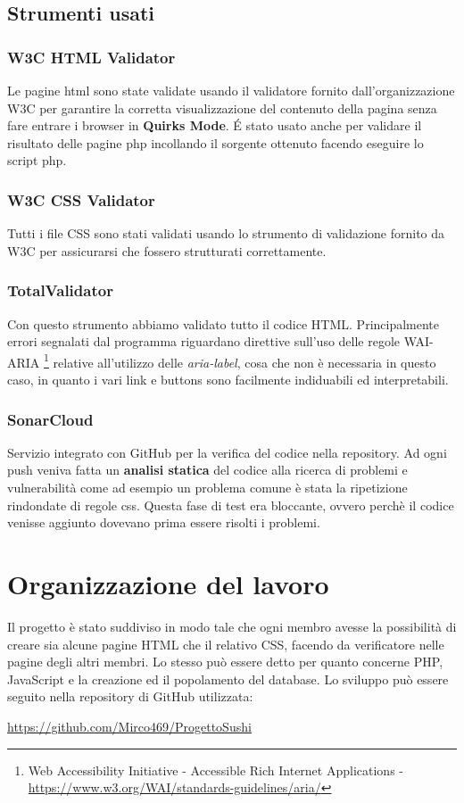 \documentclass{article}
\begin{document}
		\subsection{Strumenti usati}
		
			\subsubsection{W3C HTML Validator}
				Le pagine html sono state validate usando il validatore fornito dall'organizzazione W3C per garantire la corretta visualizzazione del contenuto della pagina senza fare entrare i browser in {\bfseries Quirks Mode}. \'E stato usato anche per validare il risultato delle pagine php incollando il sorgente ottenuto facendo eseguire lo script php.
			
			\subsubsection{W3C CSS Validator}
				Tutti i file CSS sono stati validati usando lo strumento di validazione fornito da W3C per assicurarsi che fossero strutturati correttamente.
			
			\subsubsection{TotalValidator}
			    Con questo strumento abbiamo validato tutto il codice HTML. Principalmente errori segnalati dal programma riguardano direttive sull'uso delle regole WAI-ARIA%
			    \footnote{Web Accessibility Initiative - Accessible Rich Internet Applications -  \url{https://www.w3.org/WAI/standards-guidelines/aria/}}
			    relative all'utilizzo delle \textit{aria-label}, cosa che non è necessaria in questo caso, in quanto i vari link e buttons sono facilmente indiduabili ed interpretabili.
			
			\subsubsection{SonarCloud}
				Servizio integrato con GitHub per la verifica del codice nella repository. Ad ogni push veniva fatta un {\bfseries analisi statica} del codice alla ricerca di problemi e vulnerabilità come ad esempio un problema comune è stata la ripetizione rindondate di regole css. Questa fase di test era bloccante, ovvero perchè il codice venisse aggiunto dovevano prima essere risolti i problemi.
	
	\newpage
	\section{Organizzazione del lavoro}
		Il progetto è stato suddiviso in modo tale che ogni membro avesse la possibilità di creare sia alcune pagine HTML che il relativo CSS, facendo da verificatore nelle pagine degli altri membri.
		Lo stesso può essere detto per quanto concerne PHP, JavaScript e la creazione ed il popolamento del database.
		Lo sviluppo può essere seguito nella repository di GitHub utilizzata:
		\newline
		\newline
		\centerline{ \url{https://github.com/Mirco469/ProgettoSushi}}
		
\end{document}

